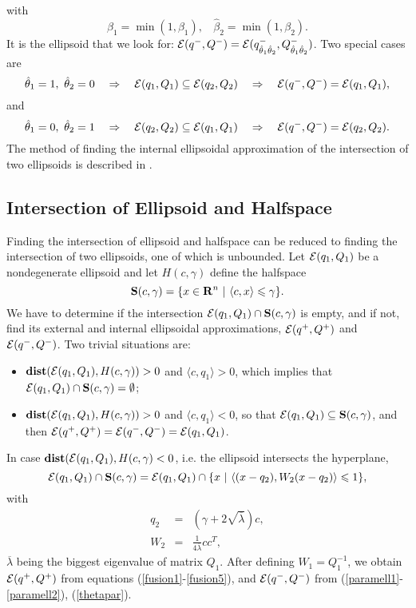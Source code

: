 with
\[ \hat{\beta}_1=\min(1,\beta_1), ~~~~ \hat{\beta}_2=\min(1,\beta_2). \]
It is the ellipsoid that we look for:
$\EE(q^-,Q^-)=\EE(q^-_{\hat{\theta}_1\hat{\theta}_2},Q^-_{\hat{\theta}_1\hat{\theta}_2})$.
Two special cases are
\[ \hat{\theta}_1=1, ~ \hat{\theta}_2=0 ~~~ \Rightarrow ~~~
\EE(q_1,Q_1)\subseteq\EE(q_2,Q_2) ~~~ \Rightarrow ~~~
\EE(q^-,Q^-)=\EE(q_1,Q_1), \]
and
\[ \hat{\theta}_1=0, ~ \hat{\theta}_2=1 ~~~ \Rightarrow ~~~
\EE(q_2,Q_2)\subseteq\EE(q_1,Q_1) ~~~ \Rightarrow ~~~
\EE(q^-,Q^-)=\EE(q_2,Q_2). \]
The method of finding the internal ellipsoidal approximation of the
intersection of two ellipsoids is described in \cite{vazhen}.












\subsection{Intersection of Ellipsoid and Halfspace}
Finding the intersection of ellipsoid and halfspace can be reduced to
finding the intersection of two ellipsoids, one of which is unbounded.
Let $\EE(q_1,Q_1)$ be a nondegenerate ellipsoid and let  $H(c,\gamma)$
define the halfspace
\[ {\bf S}(c,\gamma) = \{x\in{\bf R}^n ~|~ \langle c,x\rangle\leq\gamma\}. \]
We have to determine if the intersection $\EE(q_1,Q_1)\cap{\bf S}(c,\gamma)$
is empty, and if not, find its external and internal ellipsoidal approximations,
$\EE(q^+,Q^+)$ and $\EE(q^-,Q^-)$.
Two trivial situations are:
\begin{itemize}
\item ${\bf dist}(\EE(q_1,Q_1),H(c,\gamma))>0$ and $\langle c, q_1\rangle>0$,
which implies that $\EE(q_1,Q_1)\cap{\bf S}(c,\gamma)=\emptyset$;
\item ${\bf dist}(\EE(q_1,Q_1),H(c,\gamma))>0$ and $\langle c, q_1\rangle<0$,
so that $\EE(q_1,Q_1)\subseteq{\bf S}(c,\gamma)$, and then
$\EE(q^+,Q^+)=\EE(q^-,Q^-)=\EE(q_1,Q_1)$.
\end{itemize}
In case ${\bf dist}(\EE(q_1,Q_1),H(c,\gamma)<0$, i.e. the ellipsoid
intersects the hyperplane,
\[ \EE(q_1,Q_1)\cap{\bf S}(c,\gamma) =
\EE(q_1,Q_1)\cap\{x ~|~ \langle (x-q_2),W_2(x-q_2)\rangle\leq1\}, \]
with
\begin{eqnarray}
q_2 & = & (\gamma + 2\sqrt{\overline{\lambda}})c,\label{hsell1} \\
W_2 & = & \frac{1}{4\overline{\lambda}}cc^T,\label{hsell2}
\end{eqnarray}
 $\overline{\lambda}$ being the biggest eigenvalue of matrix $Q_1$.
After defining $W_1=Q_1^{-1}$, we obtain $\EE(q^+,Q^+)$ from  equations
(\ref{fusion1}-\ref{fusion5}), and $\EE(q^-,Q^-)$ from
(\ref{paramell1}-\ref{paramell2}), (\ref{thetapar}).

